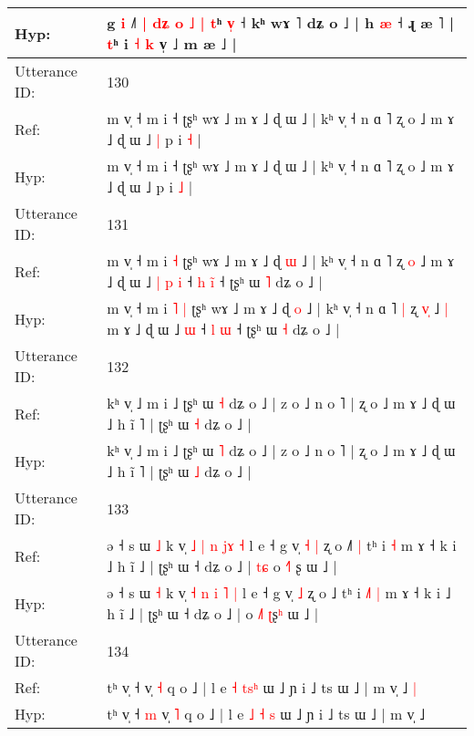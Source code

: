 \documentclass[10pt]{article}
\DeclareRobustCommand{\hl}[1]{{\textcolor{red}{#1}}}
\begin{document}
\begin{longtable}{ll}
Hyp: & g \hl{i} ˩\hl{˥} \hl{|} \hl{d}\hl{ʑ} \hl{o} \hl{˩} \hl{|}\hl{ }\hl{t}ʰ \hl{v}\hl{̩} ˧ kʰ wɤ ˥ dʑ o ˩ | h \hl{}\hl{æ} ˧ ɻ æ ˥ | \hl{}\hl{t}ʰ\hl{}\hl{}\hl{}\hl{}\hl{}\hl{}\hl{}\hl{}\hl{}\hl{}\hl{}\hl{} i\hl{}\hl{} \hl{˧} \hl{k} v̩\hl{}\hl{}\hl{}\hl{}\hl{}\hl{}\hl{} ˩ m æ ˩ |
 \\
\midrule
Utterance ID: & 130 \\
Ref: & m v̩ ˧ m i ˧ ʈʂʰ wɤ ˩ m ɤ ˩ ɖ ɯ ˩ | kʰ v̩ ˧ n ɑ ˥ ʐ o ˩ m ɤ ˩ ɖ ɯ ˩\hl{ }\hl{|} p i \hl{˧} |
 \\
Hyp: & m v̩ ˧ m i ˧ ʈʂʰ wɤ ˩ m ɤ ˩ ɖ ɯ ˩ | kʰ v̩ ˧ n ɑ ˥ ʐ o ˩ m ɤ ˩ ɖ ɯ ˩\hl{}\hl{} p i \hl{˩} |
 \\
\midrule
Utterance ID: & 131 \\
Ref: & m v̩ ˧ m i\hl{}\hl{} \hl{˧} ʈʂʰ wɤ ˩ m ɤ ˩ ɖ \hl{ɯ} ˩ | kʰ v̩ ˧ n ɑ ˥\hl{}\hl{} ʐ \hl{}\hl{o} ˩\hl{}\hl{} m ɤ ˩ ɖ ɯ ˩\hl{ }\hl{|}\hl{ }\hl{p} \hl{i} ˧ \hl{h} \hl{i}\hl{̃} ˧ ʈʂʰ ɯ \hl{˥} dʑ o ˩ |
 \\
Hyp: & m v̩ ˧ m i\hl{ }\hl{˥} \hl{|} ʈʂʰ wɤ ˩ m ɤ ˩ ɖ \hl{o} ˩ | kʰ v̩ ˧ n ɑ ˥\hl{ }\hl{|} ʐ \hl{v}\hl{̩} ˩\hl{ }\hl{|} m ɤ ˩ ɖ ɯ ˩\hl{}\hl{}\hl{}\hl{} \hl{ɯ} ˧ \hl{l} \hl{}\hl{ɯ} ˧ ʈʂʰ ɯ \hl{˧} dʑ o ˩ |
 \\
\midrule
Utterance ID: & 132 \\
Ref: & kʰ v̩ ˩ m i ˩ ʈʂʰ ɯ \hl{˧} dʑ o ˩ | z o ˩ n o ˥ | ʐ o ˩ m ɤ ˩ ɖ ɯ ˩ h ĩ ˥ | ʈʂʰ ɯ \hl{˧} dʑ o ˩ |
 \\
Hyp: & kʰ v̩ ˩ m i ˩ ʈʂʰ ɯ \hl{˥} dʑ o ˩ | z o ˩ n o ˥ | ʐ o ˩ m ɤ ˩ ɖ ɯ ˩ h ĩ ˥ | ʈʂʰ ɯ \hl{˩} dʑ o ˩ |
 \\
\midrule
Utterance ID: & 133 \\
Ref: & ə ˧ s ɯ \hl{˩} k v̩ \hl{˩} \hl{|} \hl{n} \hl{j}\hl{ɤ} \hl{˧} l e ˧ g v̩\hl{ }\hl{˧} \hl{|} ʐ o ˩\hl{˥}\hl{ }\hl{|} tʰ i\hl{}\hl{}\hl{} \hl{˧} m ɤ ˧ k i ˩ h ĩ ˩ | ʈʂʰ ɯ ˧ dʑ o ˩ |\hl{ }\hl{t}\hl{ɕ} o \hl{˧}˥ \hl{}ʂ\hl{} ɯ ˩ |
 \\
Hyp: & ə ˧ s ɯ \hl{˧} k v̩ \hl{˧} \hl{n} \hl{i} \hl{}\hl{˥} \hl{|} l e ˧ g v̩\hl{}\hl{} \hl{˩} ʐ o ˩\hl{}\hl{}\hl{} tʰ i\hl{ }\hl{˩}\hl{˥} \hl{|} m ɤ ˧ k i ˩ h ĩ ˩ | ʈʂʰ ɯ ˧ dʑ o ˩ |\hl{}\hl{}\hl{} o \hl{˩}˥ \hl{ʈ}ʂ\hl{ʰ} ɯ ˩ |
 \\
\midrule
Utterance ID: & 134 \\
Ref: & tʰ v̩ ˧\hl{}\hl{} v̩ \hl{˧} q o ˩ | l e \hl{˧} \hl{t}\hl{s}\hl{ʰ} ɯ ˩ ɲ i ˩ ts ɯ ˩ | m v̩ ˩\hl{ }\hl{|}
 \\
Hyp: & tʰ v̩ ˧\hl{ }\hl{m} v̩ \hl{˥} q o ˩ | l e \hl{˩} \hl{˧}\hl{ }\hl{s} ɯ ˩ ɲ i ˩ ts ɯ ˩ | m v̩ ˩\hl{}\hl{}
 \\

\end{longtable}
\end{document}
